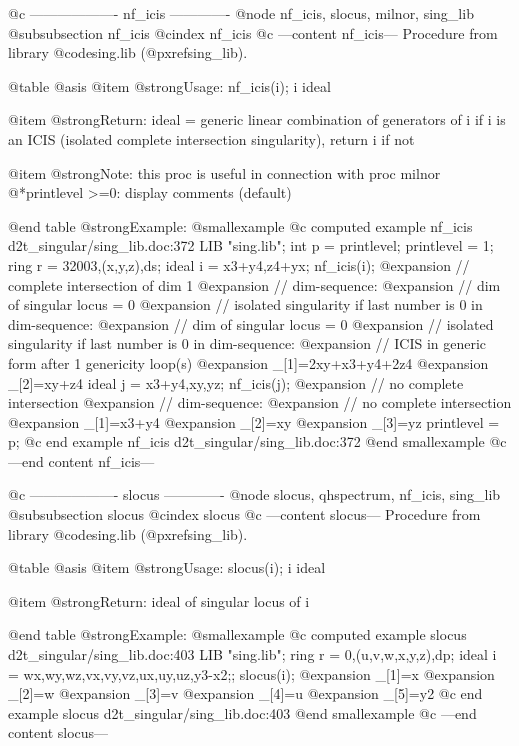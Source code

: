 @c ------------------- nf_icis -------------
@node nf_icis, slocus, milnor, sing_lib
@subsubsection nf_icis
@cindex nf_icis
@c ---content nf_icis---
Procedure from library @code{sing.lib} (@pxref{sing_lib}).

@table @asis
@item @strong{Usage:}
nf_icis(i); i ideal

@item @strong{Return:}
ideal = generic linear combination of generators of i if i is an ICIS
(isolated complete intersection singularity), return i if not

@item @strong{Note:}
this proc is useful in connection with proc milnor
@*printlevel >=0: display comments (default)

@end table
@strong{Example:}
@smallexample
@c computed example nf_icis d2t_singular/sing_lib.doc:372 
LIB "sing.lib";
int p      = printlevel;
printlevel = 1;
ring r     = 32003,(x,y,z),ds;
ideal i    = x3+y4,z4+yx;
nf_icis(i);
@expansion{} // complete intersection of dim 1
@expansion{} // dim-sequence:
@expansion{} // dim of singular locus = 0
@expansion{} // isolated singularity if last number is 0 in dim-sequence:
@expansion{} // dim of singular locus = 0
@expansion{} // isolated singularity if last number is 0 in dim-sequence:
@expansion{} // ICIS in generic form after 1 genericity loop(s)
@expansion{} _[1]=2xy+x3+y4+2z4
@expansion{} _[2]=xy+z4
ideal j    = x3+y4,xy,yz;
nf_icis(j);
@expansion{} // no complete intersection
@expansion{} // dim-sequence:
@expansion{} // no complete intersection
@expansion{} _[1]=x3+y4
@expansion{} _[2]=xy
@expansion{} _[3]=yz
printlevel = p;
@c end example nf_icis d2t_singular/sing_lib.doc:372
@end smallexample
@c ---end content nf_icis---

@c ------------------- slocus -------------
@node slocus, qhspectrum, nf_icis, sing_lib
@subsubsection slocus
@cindex slocus
@c ---content slocus---
Procedure from library @code{sing.lib} (@pxref{sing_lib}).

@table @asis
@item @strong{Usage:}
slocus(i); i ideal

@item @strong{Return:}
ideal of singular locus of i

@end table
@strong{Example:}
@smallexample
@c computed example slocus d2t_singular/sing_lib.doc:403 
LIB "sing.lib";
ring r  = 0,(u,v,w,x,y,z),dp;
ideal i = wx,wy,wz,vx,vy,vz,ux,uy,uz,y3-x2;;
slocus(i);
@expansion{} _[1]=x
@expansion{} _[2]=w
@expansion{} _[3]=v
@expansion{} _[4]=u
@expansion{} _[5]=y2
@c end example slocus d2t_singular/sing_lib.doc:403
@end smallexample
@c ---end content slocus---

